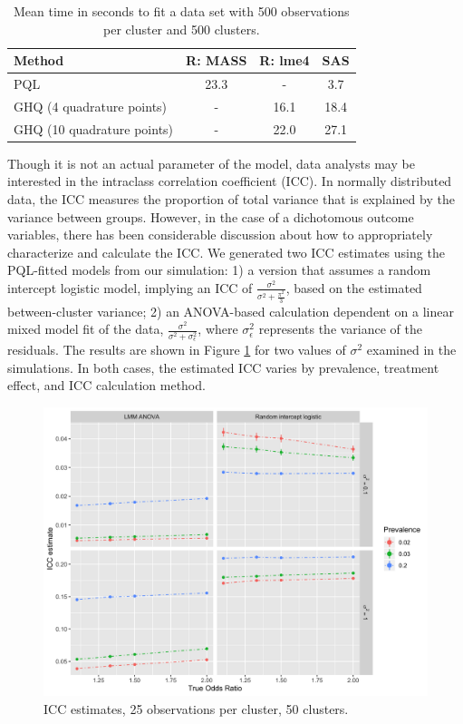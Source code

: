 \documentclass[Afour,times,sagev,doublespace]{sagej}
\begin{document}
\begin{table}[h]
\centering
 \begin{tabular}{l | c c c} 
 Method & R: MASS & R: lme4 & SAS \\ 
 \hline
 PQL & 23.3 & - & 3.7 \\ 
 GHQ (4 quadrature points) & - & 16.1 &  18.4 \\
 GHQ (10 quadrature points) & - & 22.0 &  27.1 \\ 
 \end{tabular}
    \caption{Mean time in seconds to fit a data set with 500 observations per cluster and 500 clusters.}
    \label{tab:method_speed}
\end{table}

Though it is not an actual parameter of the model, data analysts may be interested in the intraclass correlation coefficient (ICC). In normally distributed data, the ICC measures the proportion of total variance that is explained by the variance between groups. However, in the case of a dichotomous outcome variables, there has been considerable discussion about how to appropriately characterize and calculate the ICC\cite{wu_comparison_2012}\cite{nakagawa_shinichi_coefficient_2017}. We generated two ICC estimates using the PQL-fitted models from our simulation: 1) a version that assumes a random intercept logistic model, implying an ICC of $\frac{\sigma^2}{\sigma^2+\frac{\pi^2}{3}}$, based on the estimated between-cluster variance\cite{wu_comparison_2012}; 2) an ANOVA-based calculation dependent on a linear mixed model fit of the data, $\frac{\sigma^2}{\sigma^2+\sigma^2_{\epsilon}}$, where $\sigma^2_{\epsilon}$ represents the variance of the residuals\cite{wu_comparison_2012}. The results are shown in Figure \ref{fig:_icc} for two values of $\sigma^2$ examined in the simulations. In both cases, the estimated ICC varies by prevalence, treatment effect, and ICC calculation method.

\begin{figure}[]
\centering
\includegraphics[width=\linewidth]{_icc_p25_n50v2.png}
  \caption{ICC estimates, 25 observations per cluster, 50 clusters.}
    \label{fig:_icc}
\end{figure}
\end{document}
